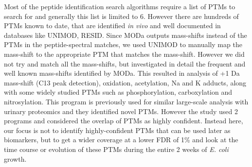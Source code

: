 \documentclass[12pt]{article}
\begin{document}


Most of the peptide identification search algorithms require a list of PTMs to search for and generally this list is limited to 6. However there are hundreds of PTMs known to date, that are identified \emph{in vivo} and well documented in databases like UNIMOD, RESID. Since MODa outputs mass-shifts instead of the PTMs in the peptide-spectral matches, we used UNIMOD to manually map the mass-shift to the appropriate PTM that matches the mass-shift. However we did not try and match all the mass-shifts, but investigated in detail the frequent and well known mass-shifts identified by MODa. This resulted in analysis of +1 Da mass-shift (C13 peak detection), oxidation, acetylation, Na and K adducts, along with some widely studied PTMs such as phosphorylation, carboxylation and nitrosylation. This program is previously used for similar large-scale analysis with urinary proteomics and they identified novel PTMs. However the study used 2 programs and considered the overlap of PTMs as highly confident. Instead here, our focus is not to identify highly-confident PTMs that can be used later as biomarkers, but to get a wider coverage at a lower FDR of 1\% and look at the time course or evolution of these PTMs during the entire 2 weeks of \emph{E. coli} growth.
\end{document}
